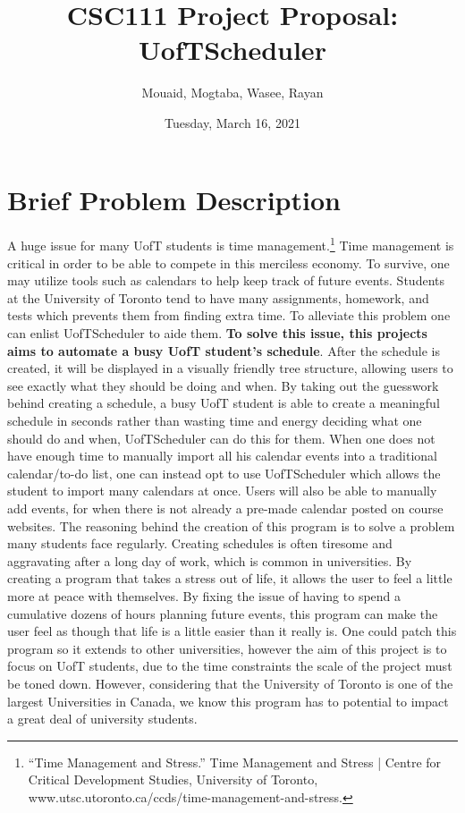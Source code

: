 \documentclass[fontsize=11pt]{article}
\title{CSC111 Project Proposal: UofTScheduler}
\author{Mouaid, Mogtaba, Wasee, Rayan}
\date{Tuesday, March 16, 2021}
\begin{document}
\maketitle

\section*{Brief Problem Description}
A huge issue for many UofT students is time management.\footnote{“Time Management and Stress.” Time Management and Stress | Centre for Critical Development Studies, University of Toronto, www.utsc.utoronto.ca/ccds/time-management-and-stress. } Time management is critical in order to be able to compete in this merciless economy. To survive, one may utilize tools such as calendars to help keep track of future events. Students at the University of Toronto tend to have many assignments, homework, and tests which prevents them from finding extra time. To alleviate this problem one can enlist UofTScheduler to aide them. \textbf{To solve this issue, this projects aims to automate a busy UofT student's schedule}. After the schedule is created, it will be displayed in a visually friendly tree structure, allowing users to see exactly what they should be doing and when. By taking out the guesswork behind creating a schedule, a busy UofT student is able to create a meaningful schedule in seconds rather than wasting time and energy deciding what one should do and when, UofTScheduler can do this for them. When one does not have enough time to manually import all his calendar events into a traditional calendar/to-do list, one can instead opt to use UofTScheduler which allows the student to import many calendars at once. Users will also be able to manually add events, for when there is not already a pre-made calendar posted on course websites. The reasoning behind the creation of this program is to solve a problem many students face regularly. Creating schedules is often tiresome and aggravating after a long day of work, which is common in universities. By creating a program that takes a stress out of life, it allows the user to feel a little more at peace with themselves. By fixing the issue of having to spend a cumulative dozens of hours planning future events, this program can make the user feel as though that life is a little easier than it really is. One could patch this program so it extends to other universities, however the aim of this project is to focus on UofT students, due to the time constraints the scale of the project must be toned down. However, considering that the University of Toronto is one of the largest Universities in Canada, we know this program has to potential to impact a great deal of university students.
\end{document}

